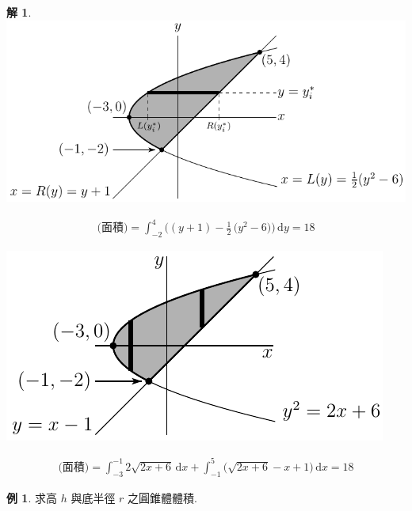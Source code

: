 \documentclass[12pt]{extarticle}
\theoremstyle{definition}
\newtheorem*{ex}{例}
\newtheorem*{sol}{解}
\begin{document}
\begin{sol}
  \begin{minipage}{.48\textwidth}
    \includegraphics[scale=.8]{areaYhor}
  \end{minipage}
  \begin{minipage}{.52\textwidth}
    \begin{align*}
      \text{(面積)} = \int_{-2}^4\!\Big((y + 1) - \frac{1}{2}\,\big(y^2 - 6\big)\Big)\,\text{d}y = 18
    \end{align*}
  \end{minipage}
  \qquad
  \begin{minipage}{.4\textwidth}
    \hspace{3mm}\includegraphics[scale=1]{areaYvert}
  \end{minipage}
  \begin{minipage}{.6\textwidth}
    \begin{align*}
      \text{(面積)} = \int_{-3}^{-1}\!2\sqrt{2x + 6}\,\text{d}x + \int_{-1}^5\!\big(\sqrt{2x + 6} - x + 1\big)\,\text{d}x = 18
    \end{align*}
  \end{minipage}
\end{sol}

\begin{ex}
  求高 $h$ 與底半徑 $r$ 之圓錐體體積. 
\end{ex}
\end{document}
